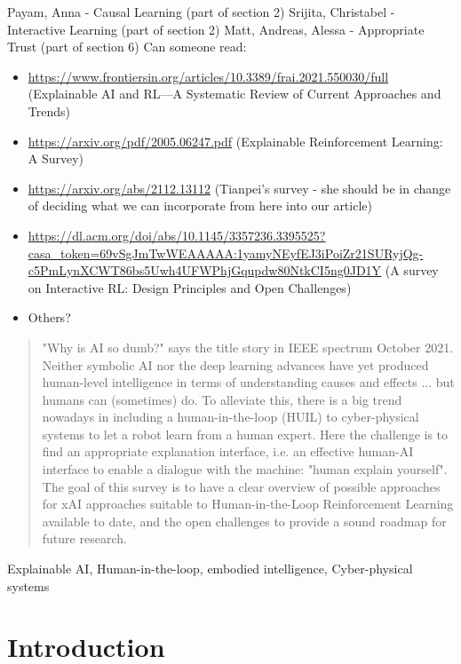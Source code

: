 \documentclass[twoside,11pt]{article}
\begin{document}

Payam, Anna - Causal Learning (part of section 2)
Srijita, Christabel - Interactive Learning (part of section 2)
Matt, Andreas, Alessa - Appropriate Trust (part of section 6)
Can someone read: 
\begin{itemize}
\item \url{https://www.frontiersin.org/articles/10.3389/frai.2021.550030/full} (Explainable AI and RL—A Systematic Review of Current Approaches and Trends)
\item \url{https://arxiv.org/pdf/2005.06247.pdf} (Explainable Reinforcement Learning: A Survey)
\item \url{https://arxiv.org/abs/2112.13112} (Tianpei's survey - she should be in change of deciding what we can incorporate from here into our article)
\item \url{https://dl.acm.org/doi/abs/10.1145/3357236.3395525?casa_token=69vSgJmTwWEAAAAA:1yamyNEyfEJ3iPoiZr21SURyjQg-c5PmLynXCWT86bs5Uwh4UFWPhjGqupdw80NtkCI5ng0JD1Y} (A survey on Interactive RL: Design Principles and Open Challenges)
\item Others?
\end{itemize}

\newpage

\begin{abstract}%
"Why is AI so dumb?" says the title story in IEEE spectrum October 2021. Neither symbolic AI nor the deep learning advances have yet produced human-level intelligence in terms of understanding causes and effects ... but humans can (sometimes) do. To alleviate this, there is a big trend nowadays in including a human-in-the-loop (HUIL) to cyber-physical systems to let a robot learn from a human expert. Here the challenge is to find an appropriate explanation interface, i.e. an effective human-AI interface to enable a dialogue with the machine: "human explain yourself".  The goal of this survey is to have a clear overview of possible approaches for xAI approaches suitable to Human-in-the-Loop Reinforcement Learning available to date, and the open challenges to provide a sound roadmap for future research.
\end{abstract}


\begin{keywords}
Explainable AI, Human-in-the-loop, embodied intelligence, Cyber-physical systems
\end{keywords}


\section{Introduction}
\label{sec:introduction}
\end{document}
